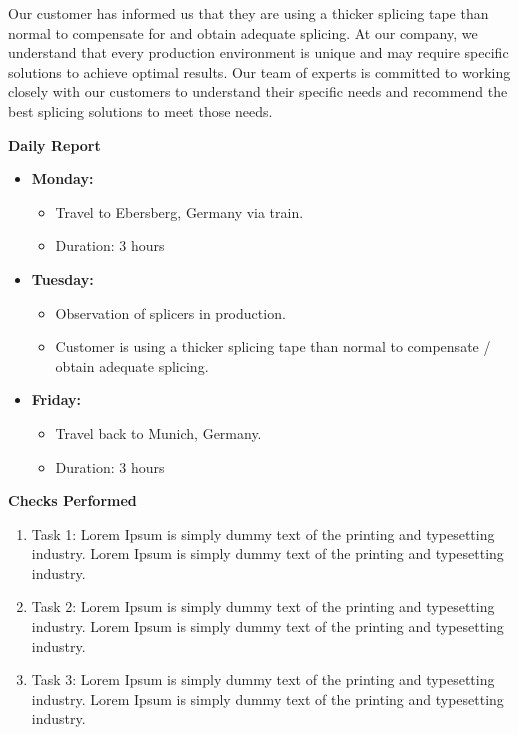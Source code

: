 \documentclass{article}
\begin{document}
\vspace{0.5em}
Our customer has informed us that they are using a thicker splicing tape than normal to compensate for and obtain adequate splicing. At our company, we understand that every production environment is unique and may require specific solutions to achieve optimal results. Our team of experts is committed to working closely with our customers to understand their specific needs and recommend the best splicing solutions to meet those needs. 

\vspace{0.25em}

\begin{center}
    \textbf{Daily Report}
\end{center}

\vspace{0.25em}

\begin{itemize}
    \item \textbf{Monday:}
    \begin{itemize}
        \item Travel to Ebersberg, Germany via train.
        \item Duration: 3 hours
    \end{itemize}
    
    \item \textbf{Tuesday:}
    \begin{itemize}
        \item Observation of splicers in production.
        \item Customer is using a thicker splicing tape than normal to compensate / obtain adequate splicing.
    \end{itemize}
    \item \textbf{Friday:}
    \begin{itemize}
        \item Travel back to Munich, Germany.
        \item Duration: 3 hours
    \end{itemize}
\end{itemize}

\vspace{0.25em}

\begin{center}
    \textbf{Checks Performed}
\end{center}

\vspace{0.25em}

\begin{enumerate}
    \item Task 1: Lorem Ipsum is simply dummy text of the printing and typesetting industry. Lorem Ipsum is simply dummy text of the printing and typesetting industry.
    \item Task 2: Lorem Ipsum is simply dummy text of the printing and typesetting industry. Lorem Ipsum is simply dummy text of the printing and typesetting industry.
    \item Task 3: Lorem Ipsum is simply dummy text of the printing and typesetting industry. Lorem Ipsum is simply dummy text of the printing and typesetting industry.
\end{enumerate}
\end{document}
